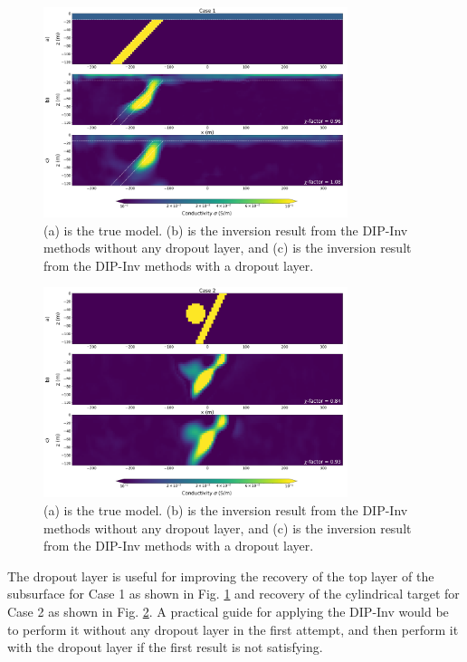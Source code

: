 \documentclass[lettersize,journal]{IEEEtran}
\begin{document}
\begin{figure}[h!]
\centering
\includegraphics[width=3.5in]{Figures/xu15.png}
\caption{(a) is the true model. (b) is the inversion result from the DIP-Inv methods without any dropout layer, and (c) is the inversion result from the DIP-Inv methods with a dropout layer.}
\label{fig3_14}
\end{figure}


\begin{figure}[h!]
\centering
\includegraphics[width=3.5in]{Figures/xu16.png}
\caption{(a) is the true model. (b) is the inversion result from the DIP-Inv methods without any dropout layer, and (c) is the inversion result from the DIP-Inv methods with a dropout layer.}
\label{fig3_15}
\end{figure}

The dropout layer is useful for improving the recovery of the top layer of the subsurface for Case 1 as shown in Fig. \ref{fig3_14} and recovery of the cylindrical target for Case 2 as shown in Fig. \ref{fig3_15}. A practical guide for applying the DIP-Inv would be to perform it without any dropout layer in the first attempt, and then perform it with the dropout layer if the first result is not satisfying.  
\end{document}
